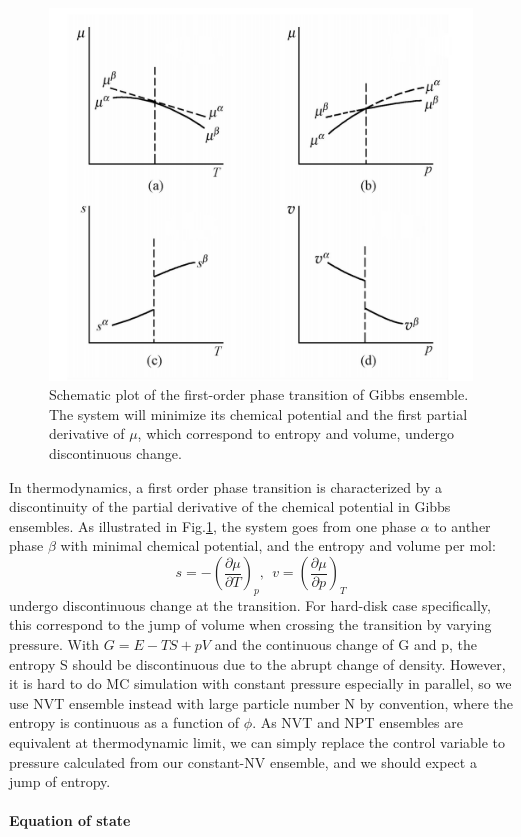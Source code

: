 \documentclass[a4paper]{article}
\begin{document}
\begin{figure}[ht]
	\centering
	\includegraphics[width=0.64\linewidth]{transition.png}
	\caption{
		\cite{zonghanlin} Schematic plot of the first-order phase transition of Gibbs ensemble. The system will minimize its chemical potential and the first partial derivative of $\mu$, which correspond to entropy and volume, undergo discontinuous change.
	}
	\label{fig:transition}
\end{figure}

In thermodynamics, a first order phase transition is characterized by a discontinuity of the partial derivative of the chemical potential in Gibbs ensembles. As illustrated in Fig.\ref{fig:transition}, the system goes from one phase $\alpha$ to anther phase $\beta$ with minimal chemical potential, and the entropy and volume per mol:
\begin{equation}
s=-\left(\frac{\partial \mu}{\partial T}\right)_p, ~~ v=\left(\frac{\partial \mu}{\partial p}\right)_T
\end{equation}
undergo discontinuous change at the transition. For hard-disk case specifically, this correspond to the jump of volume when crossing the transition by varying pressure. With $G=E-TS+pV$ and the continuous change of G and p, the entropy S should be discontinuous due to the abrupt change of density. However, it is hard to do MC simulation with constant pressure especially in parallel, so we use NVT ensemble instead with large particle number N by convention, where the entropy is continuous as a function of $\phi$. As NVT and NPT ensembles are equivalent at thermodynamic limit, we can simply replace the control variable to pressure calculated from our constant-NV ensemble, and we should expect a jump of entropy.


\paragraph{Equation of state}
\end{document}
